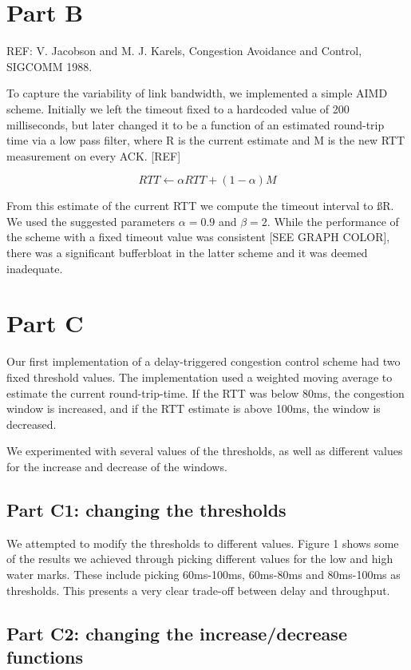 \documentclass[12pt]{article}
\begin{document}
\section*{Part B}

REF: V. Jacobson and M. J. Karels, Congestion Avoidance and Control, SIGCOMM 1988.

To capture the variability of link bandwidth, we implemented a simple AIMD
scheme.  Initially we left the timeout fixed to a hardcoded value of 200
milliseconds, but later changed it to be a function of an estimated round-trip
time via a low pass filter, where R is the current estimate and M is the new RTT
measurement on every ACK. [REF]

$${RTT} \leftarrow \alpha {RTT} + \left(1 - \alpha\right)M$$

From this estimate of the current RTT we compute the timeout interval to ßR. We
used the suggested parameters $\alpha = 0.9$ and $\beta = 2$. While the
performance of the scheme with a fixed timeout value was consistent [SEE GRAPH
COLOR], there was a significant bufferbloat in the  latter scheme and it was
deemed inadequate.

\section*{Part C}

Our first implementation of a delay-triggered congestion control scheme had two
fixed threshold values. The implementation used a weighted moving average to
estimate the current round-trip-time. If the RTT was below 80ms, the congestion
window is increased, and if the RTT estimate is above 100ms, the window is
decreased.

We experimented with several values of the thresholds, as well as different
values for the increase and decrease of the windows.

\subsection*{Part C1: changing the thresholds}

We attempted to modify the thresholds to different values. Figure 1 shows some
of the results we achieved through picking different values for the low and high
water marks. These include picking 60ms-100ms, 60ms-80ms and 80ms-100ms as
thresholds. This presents a very clear trade-off between delay and throughput.

\subsection*{Part C2: changing the increase/decrease functions}
\end{document}
